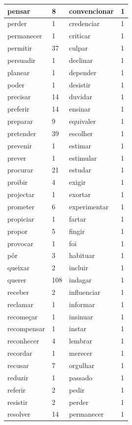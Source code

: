\documentclass[output=paper,colorlinks,citecolor=brown]{langscibook}
\begin{document}
\begin{longtable}{ p{3cm} | p{1cm} | p{3cm} | p{1cm} }
			pensar & 8 & convencionar & 1\\\hline
			perder & 1 & credenciar & 1\\\hline
			permanecer & 1 & criticar & 1\\\hline
			permitir & 37 & culpar & 1\\\hline
			persuadir & 1 & declinar & 1\\\hline
			planear & 1 & depender & 1\\\hline
			poder & 1 & desistir & 1\\\hline
			precisar & 14 & duvidar & 1\\\hline
			preferir & 14 & ensinar & 1\\\hline
			preparar & 9 & equivaler & 1\\\hline
			pretender & 39 & escolher & 1\\\hline
			prevenir & 1 & estimar & 1\\\hline
			prever & 1 & estimular & 1\\\hline
			procurar & 21 & estudar & 1\\\hline
			proibir & 4 & exigir & 1\\\hline
			projectar & 1 & exortar & 1\\\hline
			prometer & 6 & experimentar & 1\\\hline
			propiciar & 1 & fartar & 1\\\hline
			propor & 5 & fingir & 1\\\hline
			provocar & 1 & foi & 1\\\hline
			pôr & 3 & habituar & 1\\\hline
			queixar & 2 & incluir & 1\\\hline
			querer & 108 & indagar & 1\\\hline
			receber & 2 & influenciar & 1\\\hline
			reclamar & 1 & informar & 1\\\hline
			recomeçar & 1 & insinuar & 1\\\hline
			recompensar & 1 & instar & 1\\\hline
			reconhecer & 4 & lembrar & 1\\\hline
			recordar & 1 & merecer & 1\\\hline
			recusar & 7 & orgulhar & 1\\\hline
			reduzir & 1 & passado & 1\\\hline
			referir & 2 & pedir & 1\\\hline
			resistir & 2 & perder & 1\\\hline
			resolver & 14 & permanecer & 1\\\hline

\end{longtable}
\end{document}
